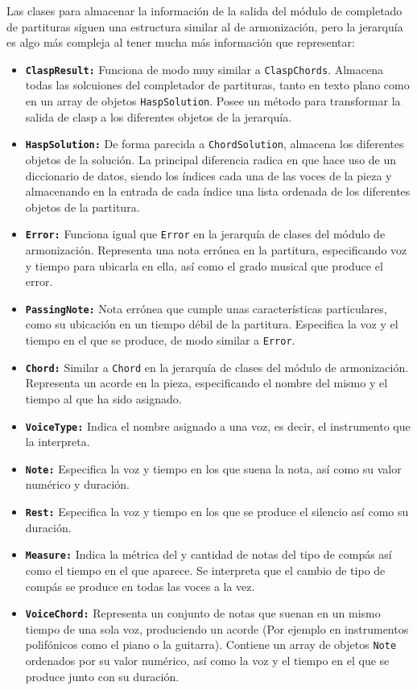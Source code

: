 Las clases para almacenar la información de la salida del módulo de completado de partituras siguen una estructura similar al de armonización, pero la jerarquía es algo más compleja al tener mucha más información que representar:
\begin{itemize}
	\item \texttt{\textbf{ClaspResult:}} Funciona de modo muy similar a \texttt{ClaspChords}. Almacena todas las solcuiones del completador de partituras, tanto en texto plano como en un array de objetos \texttt{HaspSolution}. Posee un método para transformar la salida de clasp a los diferentes objetos de la jerarquía. 
	\item \texttt{\textbf{HaspSolution:}} De forma parecida a \texttt{ChordSolution}, almacena los diferentes objetos de la solución. La principal diferencia radica en que hace uso de un diccionario de datos, siendo los índices cada una de las voces de la pieza y almacenando en la entrada de cada índice una lista ordenada de los diferentes objetos de la partitura.
	\item \texttt{\textbf{Error:}} Funciona igual que \texttt{Error} en la jerarquía de clases del módulo de armonización. Representa una nota errónea en la partitura, especificando voz y tiempo para ubicarla en ella, así como el grado musical que produce el error.
	\item \texttt{\textbf{PassingNote:}} Nota errónea que cumple unas características particulares, como su ubicación en un tiempo débil de la partitura. Especifica la voz y el tiempo en el que se produce, de modo similar a \texttt{Error}.
	\item \texttt{\textbf{Chord:}} Similar a \texttt{Chord} en la jerarquía de clases del módulo de armonización. Representa un acorde en la pieza, especificando el nombre del mismo y el tiempo al que ha sido asignado.
	\item \texttt{\textbf{VoiceType:}} Indica el nombre asignado a una voz, es decir, el instrumento que la interpreta.
	\item \texttt{\textbf{Note:}} Especifica la voz y tiempo en los que suena la nota, así como su valor numérico y duración.
	\item \texttt{\textbf{Rest:}} Especifica la voz y tiempo en los que se produce el silencio así como su duración.
	\item \texttt{\textbf{Measure:}} Indica la métrica del y cantidad de notas del tipo de compás así como el tiempo en el que aparece. Se interpreta que el cambio de tipo de compás se produce en todas las voces a la vez.
	\item \texttt{\textbf{VoiceChord:}} Representa un conjunto de notas que suenan en un mismo tiempo de una sola voz, produciendo un acorde (Por ejemplo en instrumentos polifónicos como el piano o la guitarra). Contiene un array de objetos \texttt{Note} ordenados por su valor numérico, así como la voz y el tiempo en el que se produce junto con su duración.
\end{itemize}



